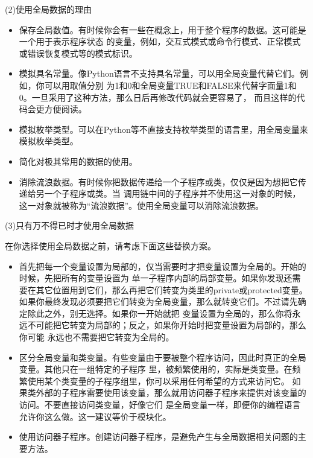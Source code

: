 \documentclass{article}
\begin{document}
\par
(2)使用全局数据的理由
\par
\begin{itemize}
    \item 保存全局数值。有时候你会有一些在概念上，用于整个程序的数据。这可能是一个用于表示程序状态
    的变量，例如，交互式模式或命令行模式、正常模式或错误恢复模式等的模式标识。
    \item 模拟具名常量。像Python语言不支持具名常量，可以用全局变量代替它们。例如，你可以用取值分别
    为1和0和全局变量TRUE和FALSE来代替字面量1和0。一旦采用了这种方法，那么日后再修改代码就会更容易了，
    而且这样的代码会更方便阅读。
    \item 模拟枚举类型。可以在Python等不直接支持枚举类型的语言里，用全局变量来模拟枚举类型。
    \item 简化对极其常用的数据的使用。
    \item 消除流浪数据。有时候你把数据传递给一个子程序或类，仅仅是因为想把它传递给另一个子程序或类。当
    调用链中间的子程序并不使用这一对象的时候，这一对象就被称为“流浪数据”。使用全局变量可以消除流浪数据。
\end{itemize}

\par
(3)只有万不得已时才使用全局数据
\par
在你选择使用全局数据之前，请考虑下面这些替换方案。
\begin{itemize}
    \item 首先把每一个变量设置为局部的，仅当需要时才把变量设置为全局的。开始的时候，先把所有的变量设置为
    单一子程序内部的局部变量。如果你发现还需要在其它位置用到它们，那么再把它们转变为类里的private或protected变量。
    如果你最终发现必须要把它们转变为全局变量，那么就转变它们。不过请先确定除此之外，别无选择。如果你一开始就把
    变量设置为全局的，那么你将永远不可能把它转变为局部的；反之，如果你开始时把变量设置为局部的，那么你可能
    永远也不需要把它转变为全局的。
    \item 区分全局变量和类变量。有些变量由于要被整个程序访问，因此时真正的全局变量。其他只在一组特定的子程序
    里，被频繁使用的，实际是类变量。在频繁使用某个类变量的子程序组里，你可以采用任何希望的方式来访问它。
    如果类外部的子程序需要使用该变量，那么就用访问器子程序来提供对该变量的访问。不要直接访问类变量，好像它们
    是全局变量一样，即便你的编程语言允许你这么做。这一建议等价于模块化。
    \item 使用访问器子程序。创建访问器子程序，是避免产生与全局数据相关问题的主要方法。
\end{itemize}
\end{document}
